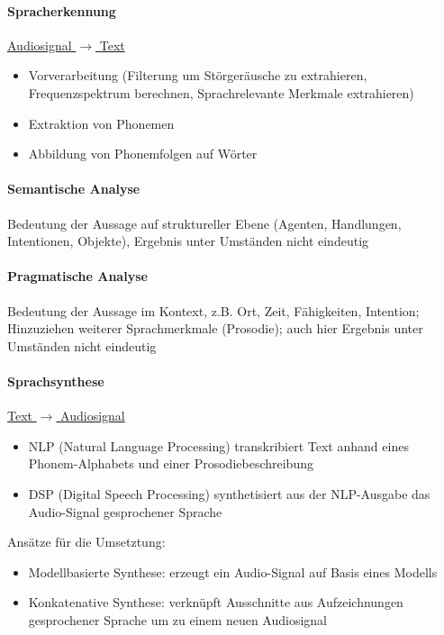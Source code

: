 \documentclass[8pt,a4paper,landscape]{extarticle}
\begin{document}
\begin{multicols*}{4}
	\paragraph{Spracherkennung} \underline{Audiosignal \(\rightarrow\) Text}
	\begin{itemize}
		\item Vorverarbeitung (Filterung um Störgeräusche zu extrahieren,
		      Frequenzspektrum berechnen, Sprachrelevante Merkmale extrahieren)
		\item Extraktion von Phonemen
		\item Abbildung von Phonemfolgen auf Wörter
	\end{itemize}
	\paragraph{Semantische Analyse} Bedeutung der Aussage auf struktureller
	Ebene (Agenten, Handlungen, Intentionen, Objekte), Ergebnis unter Umständen
	nicht eindeutig
	\paragraph{Pragmatische Analyse} Bedeutung der Aussage im Kontext, z.B. Ort,
	Zeit, Fähigkeiten, Intention; Hinzuziehen weiterer Sprachmerkmale (Prosodie);
	auch hier Ergebnis unter Umständen nicht eindeutig
	\paragraph{Sprachsynthese} \underline{Text \(\rightarrow\) Audiosignal}
	\begin{itemize}
		\item NLP (Natural Language Processing) transkribiert Text anhand eines
		      Phonem-Alphabets und einer Prosodiebeschreibung
		\item DSP (Digital Speech Processing) synthetisiert aus der NLP-Ausgabe
		      das Audio-Signal gesprochener Sprache
	\end{itemize}
	Ansätze für die Umsetztung:
	\begin{itemize}
		\item Modellbasierte Synthese: erzeugt ein Audio-Signal auf Basis eines
		      Modells
		\item Konkatenative Synthese: verknüpft Ausschnitte aus Aufzeichnungen
		      gesprochener Sprache um zu einem neuen Audiosignal
	\end{itemize}

\end{multicols*}
\end{document}
